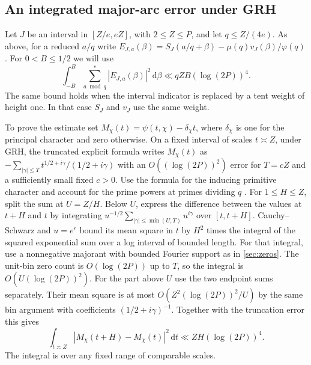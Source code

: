 \documentclass[11pt,a4paper]{article}
\numberwithin{equation}{section}
\newcommand{\ud}{\mathrm d}
\begin{document}
\subsection{An integrated major-arc error under GRH}

Let $J$ be an interval in $[Z/e,eZ]$, with $2\le Z\le P$,
and let $q\le Z/(4e)$. As above, for a reduced $a/q$ write
$E_{J,a}(\beta)=S_J(a/q+\beta)-\mu(q)v_J(\beta)/\varphi(q)$.
For $0<B\le1/2$ we will use
\begin{equation}
 \int_{-B}^B\sum_{a\bmod q}^{*}|E_{J,a}(\beta)|^2\,\ud\beta
       \ll qZ B(\log(2P))^4 .
 \label{eq:arcintegrated}
\end{equation}
The same bound holds when the interval indicator is replaced
by a tent weight of height one. In that case $S_J$ and $v_J$
use the same weight.

To prove the estimate set $M_\chi(t)=\psi(t,\chi)-\delta_\chi t$,
where $\delta_\chi$ is one for the principal character and zero
otherwise. On a fixed interval of scales $t\asymp Z$, under GRH,
the truncated explicit formula writes $M_\chi(t)$ as
$-\sum_{|\gamma|\le T}t^{1/2+i\gamma}/(1/2+i\gamma)$
with an $O((\log(2P))^2)$ error for $T=cZ$ and a sufficiently
small fixed $c>0$. Use the formula for the inducing primitive
character and account for the prime powers at primes dividing
$q$ \cite[Lemmas~1--2]{KLM}. For $1\le H\le Z$, split the
sum at $U=Z/H$. Below $U$, express the difference between
the values at $t+H$ and $t$ by integrating
$u^{-1/2}\sum_{|\gamma|\le\min(U,T)}u^{i\gamma}$
over $[t,t+H]$. Cauchy--Schwarz and $u=e^r$ bound its
mean square in $t$ by $H^2$ times the integral of the
squared exponential sum over a log interval of bounded length.
For that integral, use a nonnegative majorant with bounded
Fourier support as in \cref{sec:zeros}. The unit-bin zero
count is $O(\log(2P))$ up to $T$, so the integral is
$O(U(\log(2P))^2)$. For the part above $U$ use the two
endpoint sums separately. Their mean square is at most
$O(Z^2(\log(2P))^2/U)$ by the same bin argument with
coefficients $(1/2+i\gamma)^{-1}$.
Together with the truncation error this gives
\[
 \int_{t\asymp Z}|M_\chi(t+H)-M_\chi(t)|^2\,\ud t
       \ll ZH(\log(2P))^4 .
\]
The integral is over any fixed range of comparable scales.
\end{document}
